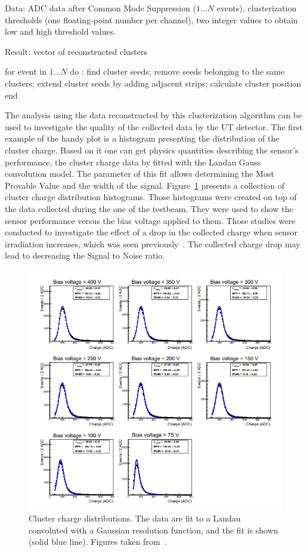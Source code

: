 \begin{algorithm}[caption={Cluster Creator algorithm}, label={al:cluster creator}]
Data: ADC data after Common Mode Suppression ($1 \ldots N$ events),
      clusterization thresholds (one floating-point number per channel),  
      two integer values to obtain low and high threshold values. 

Result: vector of reconstructed clusters

for event in $1 \ldots N$ do :
   find cluster seeds;
   remove seeds belonging to the same clusters;
   extend cluster seeds by adding adjacent strips;
   calculate cluster position
end
\end{algorithm}


The analysis using the data reconstructed by this clusterization algorithm can be used to investigate the quality of the collected data by the UT detector. The first example of the handy plot is a histogram presenting the distribution of the cluster charge. Based on it one can get physics quantities describing the sensor's performance, the cluster charge data by fitted with the Landau Gauss convolution model. The parameter of this fit allows determining the Most Provable Value and the width of the signal.  Figure~\ref{fig:clusters_with_landau} presents a collection of cluster charge distribution histograms. Those histograms were created on top of the data collected during the one of the testbeam. They were used to show the sensor performance versus the bias voltage applied to them.  Those studies were conducted to investigate the effect of a drop in the collected charge when sensor irradiation increases, which was seen previously~\cite{irradiation}. The collected charge drop may lead to decreasing the Signal to Noise ratio.  


\begin{figure}
\centering
\includegraphics{figures/landau.png}
\caption{Cluster charge distributions. The data are fit to a Landau 
convoluted with a Gaussian resolution function, and the fit is shown (solid blue line). Figures taken from~\cite{tb1}. 
}\label{fig:clusters_with_landau}
\end{figure}

